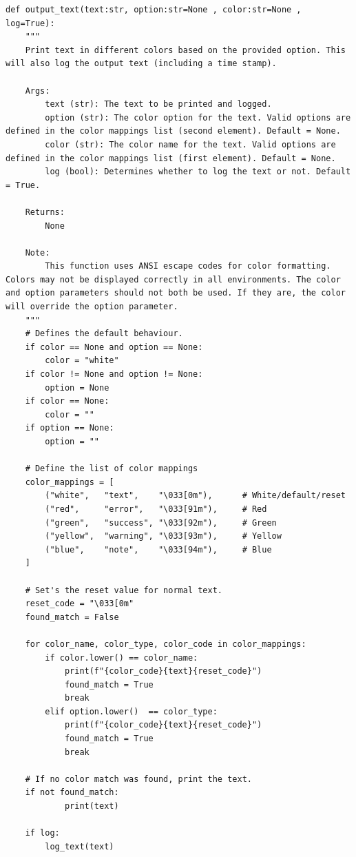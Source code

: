 \begin{lstlisting}
def output_text(text:str, option:str=None , color:str=None , log=True):
    """
    Print text in different colors based on the provided option. This will also log the output text (including a time stamp).

    Args:
        text (str): The text to be printed and logged.
        option (str): The color option for the text. Valid options are defined in the color mappings list (second element). Default = None.
        color (str): The color name for the text. Valid options are defined in the color mappings list (first element). Default = None.
        log (bool): Determines whether to log the text or not. Default = True.        

    Returns:
        None

    Note:
        This function uses ANSI escape codes for color formatting. Colors may not be displayed correctly in all environments. The color and option parameters should not both be used. If they are, the color will override the option parameter.
    """
    # Defines the default behaviour.
    if color == None and option == None:
        color = "white"  
    if color != None and option != None:
        option = None
    if color == None:
        color = ""
    if option == None:
        option = ""
        
    # Define the list of color mappings
    color_mappings = [
        ("white",   "text",    "\033[0m"),      # White/default/reset
        ("red",     "error",   "\033[91m"),     # Red
        ("green",   "success", "\033[92m"),     # Green
        ("yellow",  "warning", "\033[93m"),     # Yellow
        ("blue",    "note",    "\033[94m"),     # Blue
    ]
    
    # Set's the reset value for normal text.
    reset_code = "\033[0m"
    found_match = False    
    
    for color_name, color_type, color_code in color_mappings:
        if color.lower() == color_name:
            print(f"{color_code}{text}{reset_code}")
            found_match = True
            break
        elif option.lower()  == color_type:
            print(f"{color_code}{text}{reset_code}")
            found_match = True
            break
            
    # If no color match was found, print the text.         
    if not found_match:
            print(text)
    
    if log:
        log_text(text)
\end{lstlisting}

